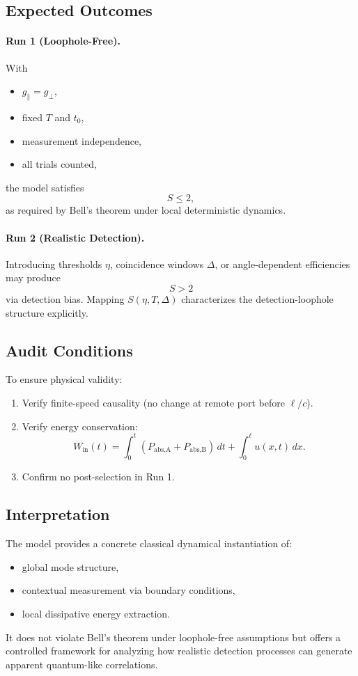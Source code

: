 \subsection{Expected Outcomes}

\paragraph{Run 1 (Loophole-Free).}
With
\begin{itemize}
    \item $g_\parallel = g_\perp$,
    \item fixed $T$ and $t_0$,
    \item measurement independence,
    \item all trials counted,
\end{itemize}
the model satisfies
\begin{equation}
S \le 2,
\end{equation}
as required by Bell's theorem under local deterministic dynamics.

\paragraph{Run 2 (Realistic Detection).}
Introducing thresholds $\eta$, coincidence windows $\Delta$, or angle-dependent efficiencies may produce
\begin{equation}
S > 2
\end{equation}
via detection bias. Mapping $S(\eta,T,\Delta)$ characterizes the detection-loophole structure explicitly.

\subsection{Audit Conditions}

To ensure physical validity:
\begin{enumerate}
    \item Verify finite-speed causality (no change at remote port before $\ell/c$).
    \item Verify energy conservation:
    \[
    W_{\text{in}}(t)
    =
    \int_0^t (P_{\text{abs,A}} + P_{\text{abs,B}})\, dt
    + \int_0^\ell u(x,t)\, dx.
    \]
    \item Confirm no post-selection in Run 1.
\end{enumerate}

\subsection{Interpretation}

The model provides a concrete classical dynamical instantiation of:
\begin{itemize}
    \item global mode structure,
    \item contextual measurement via boundary conditions,
    \item local dissipative energy extraction.
\end{itemize}

It does not violate Bell's theorem under loophole-free assumptions but offers a controlled framework for analyzing how realistic detection processes can generate apparent quantum-like correlations.
